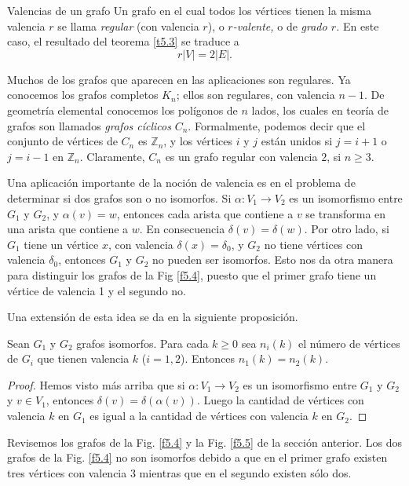 \begin{section}{Valencias de un grafo}
Un grafo en el cual todos los vértices tienen la misma valencia $r$ se llama \textit{regular}   (con valencia $r$), o \textit{$r$-valente,} o de \textit{grado $r$.} En este caso, el resultado del teorema \ref{t5.3} se traduce a
$$
r|V|=2|E|.
$$

Muchos de los grafos que aparecen en las aplicaciones son regulares. Ya conocemos los  grafos completos $K_n$; ellos son regulares, con valencia $n-1$. De geometría elemental conocemos los polígonos de $n$ lados, los cuales en teoría de grafos son llamados \textit{{grafos cíclicos}}   $C_n$. Formalmente, podemos decir que el conjunto de vértices de $C_n$ es $\mathbb Z_n$, y los vértices $i$ y $j$ están unidos si $j=i+1$ o $j=i-1$ en $\mathbb Z_n$. Claramente, $C_n$ es un grafo regular con valencia $2$, si $n\ge 3$.

Una aplicación importante de la noción de valencia es en el problema de determinar si dos grafos son o no isomorfos. Si $\alpha:V_1 \to  V_2$ es un isomorfismo entre $G_1$ y $G_2$, y $\alpha(v)=w$, entonces cada arista que contiene a $v$ se transforma en una arista que contiene a $w$. En consecuencia $\delta(v)=\delta(w)$. Por otro lado, si $G_1$ tiene un vértice $x$, con valencia $\delta(x)=\delta_0$, y $G_2$ no tiene vértices con valencia $\delta_0$, entonces $G_1$ y $G_2$ no pueden ser isomorfos. Esto nos da otra manera para distinguir los grafos de la Fig \ref{f5.4}, puesto que el primer grafo tiene un vértice de valencia 1 y el segundo no.

Una extensión de esta idea se da en la siguiente proposición.

\begin{proposicion}\label{criterioiso}Sean  $G_1$ y $G_2$ grafos isomorfos. Para cada $k\ge 0$ sea $n_i(k)$ el número de vértices de $G_i$ que tienen valencia $k$ ($i=1,2$). Entonces $n_1(k)=n_2(k)$.
\end{proposicion}
\begin{proof} Hemos visto más arriba que si $\alpha:V_1 \to  V_2$ es un isomorfismo entre $G_1$ y $G_2$ y $v\in V_1$, entonces $\delta(v)=\delta(\alpha(v))$. Luego la cantidad de vértices con valencia $k$ en $G_1$ es igual  a la cantidad de vértices con valencia $k$ en $G_2$.     
\end{proof}

\begin{ejemplo*} Revisemos los grafos de la Fig. \ref{f5.4} y la Fig. \ref{f5.5} de la sección anterior.  Los dos grafos de la Fig. \ref{f5.4}  no son isomorfos debido a que en el primer grafo existen tres vértices con valencia $3$ mientras que en el segundo existen sólo dos.


\end{ejemplo*}
\end{section}
